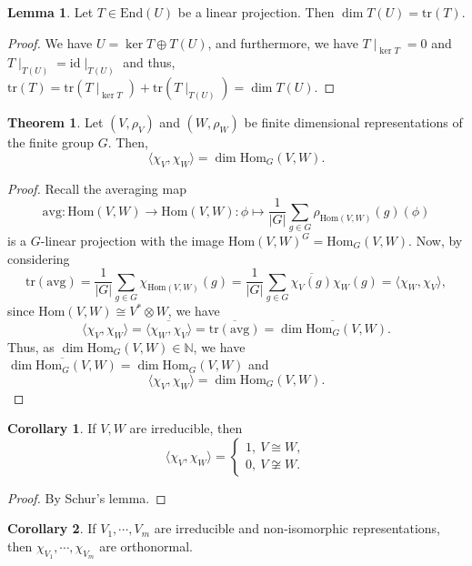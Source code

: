 \documentclass[]{article}
\theoremstyle{definition}
\newtheorem{theorem}{Theorem}
\newtheorem{corollary}{Corollary}[theorem]
\theoremstyle{definition}
\newtheorem{lemma}{Lemma}[section]
\begin{document}
\begin{lemma}
  Let \(T \in \text{End}(U)\) be a linear projection. Then 
  \(\dim T(U) = \text{tr}(T)\).
\end{lemma}
\begin{proof}
  We have \(U = \ker T \oplus T(U)\), and furthermore, we have 
  \(T\mid_{\ker T} = 0\) and \(T\mid_{T(U)} = \text{id}\mid_{T(U)}\) and thus, 
  \(\text{tr}(T) = \text{tr}(T\mid_{\ker T}) + \text{tr}(T\mid_{T(U)}) = 
    \dim T(U)\).
\end{proof}

\begin{theorem}
  Let \((V, \rho_V)\) and \((W, \rho_W)\) be finite dimensional representations 
  of the finite group \(G\). Then, 
  \[\langle \chi_V, \chi_W \rangle = \dim \text{Hom}_G(V, W).\]
\end{theorem}
\begin{proof}
  Recall the averaging map 
  \[\text{avg} : \text{Hom}(V, W) \to \text{Hom}(V, W) : \phi \mapsto 
    \frac{1}{|G|} \sum_{g \in G} \rho_{\text{Hom}(V, W)} (g)(\phi)\]
  is a \(G\)-linear projection with the image 
  \(\text{Hom}(V, W)^G = \text{Hom}_G(V, W)\). Now, by considering 
  \[\text{tr}(\text{avg}) = \frac{1}{|G|} \sum_{g \in G} \chi_{\text{Hom}(V, W)}(g)
    = \frac{1}{|G|} \sum_{g \in G} \overline{\chi_V(g)}\chi_W(g) = 
    \langle \chi_W, \chi_V \rangle,\]
  since \(\text{Hom}(V, W) \cong V^* \otimes W\), we have 
  \[\langle \chi_V, \chi_W \rangle = \overline{\langle \chi_W, \chi_V \rangle}  
    = \overline{\text{tr}(\text{avg})} = \overline{\dim \text{Hom}_G(V, W)}.\]
  Thus, as \(\dim \text{Hom}_G(V, W) \in \mathbb{N}\), we have 
  \(\overline{\dim \text{Hom}_G(V, W)} = \dim \text{Hom}_G(V, W)\) and 
  \[\langle \chi_V, \chi_W \rangle = \dim \text{Hom}_G(V, W).\]
\end{proof}

\begin{corollary}
  If \(V, W\) are irreducible, then 
  \[\langle \chi_V, \chi_W \rangle = \begin{cases} 
    1, \ V \cong W,\\
    0, \ V \not\cong W.
  \end{cases}\]
\end{corollary}
\begin{proof}
  By Schur's lemma.
\end{proof}

\begin{corollary}
  If \(V_1, \cdots, V_m\) are irreducible and non-isomorphic representations, 
  then \(\chi_{V_1}, \cdots, \chi_{V_m}\) are orthonormal.
\end{corollary}
\end{document}
